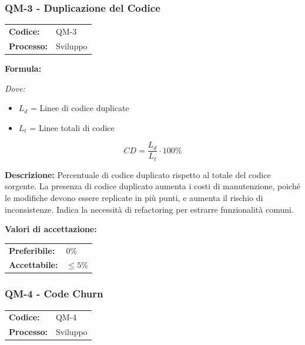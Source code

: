 \documentclass[a4paper,11pt,oneside]{scrartcl}
\begin{document}
\subsubsection{QM-3 - Duplicazione del Codice}

\noindent
\begin{tabular}{@{}p{}p{}@{}}
\textbf{Codice:} & QM-3 \\
\textbf{Processo:} & Sviluppo \\
\end{tabular}

\vspace{0.3cm}
\noindent\textbf{Formula:}

\noindent\textit{Dove:}
\begin{itemize}[leftmargin=1.5cm, topsep=0pt, itemsep=0pt]
    \item $L_d$ = Linee di codice duplicate
    \item $L_t$ = Linee totali di codice
\end{itemize}

\[
CD = \frac{L_d}{L_t} \cdot 100\%
\]

\noindent\textbf{Descrizione:} Percentuale di codice duplicato rispetto al totale del codice sorgente. La presenza di codice duplicato aumenta i costi di manutenzione, poiché le modifiche devono essere replicate in più punti, e aumenta il rischio di inconsistenze. Indica la necessità di refactoring per estrarre funzionalità comuni.

\vspace{0.2cm}
\noindent\textbf{Valori di accettazione:}
\vspace{0.1cm}

\noindent
\begin{tabular}{@{}ll@{}}
\textbf{Preferibile:} & $0\%$ \\
\textbf{Accettabile:} & $\le 5\%$ \\
\end{tabular}

\subsubsection{QM-4 - Code Churn}

\noindent
\begin{tabular}{@{}p{}p{}@{}}
\textbf{Codice:} & QM-4 \\
\textbf{Processo:} & Sviluppo \\
\end{tabular}
\end{document}

